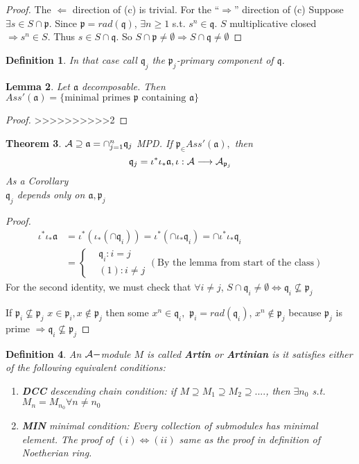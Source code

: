\documentclass[11pt]{article}
\newtheorem{thm}{Theorem}[section]
\newtheorem{lemma}[thm]{Lemma}
\newtheorem{dfn}[thm]{Definition}
\newcommand{\sca}{{\mathfrak a}}
\newcommand{\scp}{{\mathfrak p}}
\newcommand{\scq}{\mathfrak q}
\newcommand{\cala}{{\cal A}}
\newcommand{\Lrta}{\Longrightarrow}
\newcommand{\lrta}{\longrightarrow}
\newcommand{\Llta}{\Longleftarrow}
\newcommand{\Llrta}{\Longleftrightarrow}
\begin{document}
\begin{proof}
The $\Llta$ direction of (c) is trivial. For the ``$\Lrta$'' direction of (c) Suppose $\exists s\in S\cap\scp$. Since $\scp=rad(\scq)$, $\exists n\geq 1 $ s.t. $s^n\in \scq$. $S$ multiplicative closed $\Lrta s^n\in S$. Thus $s\in S\cap \scq$. So $S\cap \scp\neq \emptyset \Lrta S\cap\scq\neq \emptyset$

\end{proof}


\begin{dfn}
In that case call $\scq_j$ the $\scp_j$-primary component of  $\scq$.
\end{dfn}

\begin{lemma}
Let $\sca$ decomposable. Then $Ass'(\sca)=\{\text{minimal primes $\scp$ containing $\sca$}\}$
\end{lemma}
\begin{proof}
>>>>>>>>>>2
\end{proof}

\begin{thm}
$\cala\supseteq \sca=\cap_{j=1}^n\scq_j$ MPD. If $\scp_\in Ass'(\sca),$ then 
$$
\scq_j=\iota^*\iota_*\sca,\iota:\cala\lrta \cala_{\scp_{j}}
$$
As a Corollary\\
$\scq_j$ depends only on $\sca,\scp_j$
\end{thm}
\begin{proof}
$$
\begin{aligned}
\iota^*\iota_*\sca&=\iota^*(\iota_*(\cap\scq_i))=\iota^*(\cap\iota_*\scq_i)=\cap\iota^*\iota_*\scq_i\\
&
=\left\{
\begin{aligned}
&\scq_i: i= j\\
& (1) :i\neq j
\end{aligned}
\right.
(\text{By the lemma from start of the class})
\end{aligned}
$$
For the second identity, we must check that $\forall i\neq j$, $S\cap \scq_i\neq \emptyset\Llrta \scq_i\not\subseteq \scp_j$

If $\scp_i\not\subseteq \scp_j$ $x\in\scp_i,x\notin\scp_j$ then some $x^n\in\scq_i,$ $\scp_i=rad(\scq_i)$, $x^n\notin \scp_j$ because $\scp_j$ is prime $\Lrta \scq_i\not\subseteq \scp_j$
\end{proof}

\begin{dfn}
An $\cala-$module $M$ is called \textbf{Artin} or \textbf{Artinian} is it satisfies either of the following equivalent conditions:
\begin{enumerate}[label=(\roman*)]
\item \textbf{DCC} descending chain condition: if $M\supseteq M_1\supseteq M_2\supseteq ....$, then $\exists n_0$ s.t. $M_n=M_{n_0}\forall n\neq n_0$
\item \textbf{MIN} minimal condition: Every collection of submodules has minimal element.
The proof of $(i)\Llrta (ii)$ same as the proof in definition of Noetherian ring.
\end{enumerate}
\end{dfn}
\end{document}
